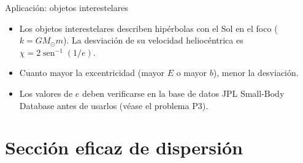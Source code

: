 \documentclass[aspectratio=169]{beamer}
\providecommand{\sen}{}
\renewcommand{\sen}{\operatorname{sen}}
\begin{document}
\begin{frame}{Aplicación: objetos interestelares}
\begin{itemize}
  \item<1-> Los objetos interestelares describen hipérbolas con el Sol en el foco
        ($k=GM_\odot m$). La desviación de su velocidad heliocéntrica es
        $\chi=2\sen^{-1}(1/e)$.
\end{itemize}
\begin{itemize}
  \item<3-> Cuanto mayor la excentricidad (mayor $E$ o mayor $b$), menor la desviación.
  \item<4-> Los valores de $e$ deben verificarse en la base de datos
        JPL Small-Body Database antes de usarlos (véase el problema P3).
\end{itemize}
\end{frame}

\section[Sección eficaz]{Sección eficaz de dispersión}
\end{document}
